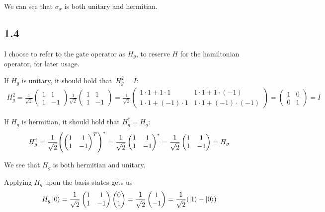 \documentclass[12p,a4paper]{article}
\newcommand{\0}{\ket{0}}
\newcommand{\1}{\ket{1}}
\begin{document}
We can see that $\sigma_x$ is both unitary and hermitian.



\subsection*{1.4}
I choose to refer to the gate operator as $H_g$, to reserve $H$ for the hamiltonian operator, for later usage.

If $H_g$ is unitary, it should hold that $H_g^2 = I$:
\begin{align*}
    H_g^2 =
    \frac{1}{\sqrt{2}} \begin{pmatrix} 1 & 1 \\ 1 & -1 \end{pmatrix} \frac{1}{\sqrt{2}} \begin{pmatrix} 1 & 1 \\ 1 & -1 \end{pmatrix}
    = \frac{1}{\sqrt{2}} \begin{pmatrix} 1\cdot 1 + 1\cdot 1 & 1\cdot 1 + 1\cdot(-1) \\ 1\cdot 1 + (-1)\cdot 1 & 1\cdot 1 + (-1)\cdot(-1) \end{pmatrix} = \begin{pmatrix} 1 & 0 \\ 0 & 1 \end{pmatrix} = I
\end{align*}

If $H_g$ is hermitian, it should hold that $H_g^\dag = H_g$:
\begin{align*}
    H_g^\dag = \frac{1}{\sqrt{2}}\qty(\begin{pmatrix} 1 & 1 \\ 1 & -1 \end{pmatrix}^T)^* = \frac{1}{\sqrt{2}}\begin{pmatrix} 1 & 1 \\ 1 & -1 \end{pmatrix}^* = \frac{1}{\sqrt{2}}\begin{pmatrix} 1 & 1 \\ 1 & -1 \end{pmatrix} = H_g
\end{align*}

We see that $H_g$ is both hermitian and unitary.

Applying $H_g$ upon the basis states gets us
\begin{align*}
    H_g\ket{0} = \frac{1}{\sqrt{2}}\begin{pmatrix} 1 & 1 \\ 1 & -1 \end{pmatrix}\begin{pmatrix} 0 \\ 1 \end{pmatrix} = \frac{1}{\sqrt{2}}\begin{pmatrix} 1 \\ -1 \end{pmatrix} = \frac{1}{\sqrt{2}}\qty(\ket{1} - \ket{0})
\end{align*}
\end{document}

